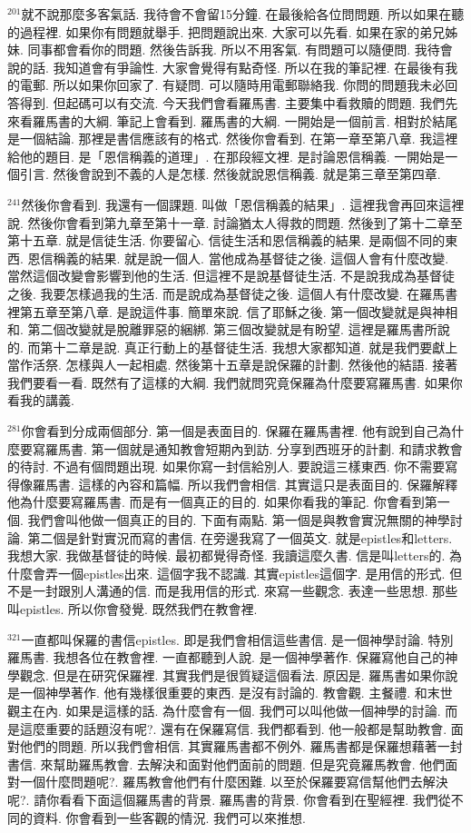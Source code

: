 \documentclass{book}
\begin{document}
$^{201}$就不說那麼多客氣話.
我待會不會留15分鐘.
在最後給各位問問題.
所以如果在聽的過程裡.
如果你有問題就舉手.
把問題說出來.
大家可以先看.
如果在家的弟兄姊妹.
同事都會看你的問題.
然後告訴我.
所以不用客氣.
有問題可以隨便問.
我待會說的話.
我知道會有爭論性.
大家會覺得有點奇怪.
所以在我的筆記裡.
在最後有我的電郵.
所以如果你回家了.
有疑問.
可以隨時用電郵聯絡我.
你問的問題我未必回答得到.
但起碼可以有交流.
今天我們會看羅馬書.
主要集中看救贖的問題.
我們先來看羅馬書的大綱.
筆記上會看到.
羅馬書的大綱.
一開始是一個前言.
相對於結尾是一個結論.
那裡是書信應該有的格式.
然後你會看到.
在第一章至第八章.
我這裡給他的題目.
是「恩信稱義的道理」.
在那段經文裡.
是討論恩信稱義.
一開始是一個引言.
然後會說到不義的人是怎樣.
然後就說恩信稱義.
就是第三章至第四章.

$^{241}$然後你會看到.
我還有一個課題.
叫做「恩信稱義的結果」.
這裡我會再回來這裡說.
然後你會看到第九章至第十一章.
討論猶太人得救的問題.
然後到了第十二章至第十五章.
就是信徒生活.
你要留心.
信徒生活和恩信稱義的結果.
是兩個不同的東西.
恩信稱義的結果.
就是說一個人.
當他成為基督徒之後.
這個人會有什麼改變.
當然這個改變會影響到他的生活.
但這裡不是說基督徒生活.
不是說我成為基督徒之後.
我要怎樣過我的生活.
而是說成為基督徒之後.
這個人有什麼改變.
在羅馬書裡第五章至第八章.
是說這件事.
簡單來說.
信了耶穌之後.
第一個改變就是與神相和.
第二個改變就是脫離罪惡的綑綁.
第三個改變就是有盼望.
這裡是羅馬書所說的.
而第十二章是說.
真正行動上的基督徒生活.
我想大家都知道.
就是我們要獻上當作活祭.
怎樣與人一起相處.
然後第十五章是說保羅的計劃.
然後他的結語.
接著我們要看一看.
既然有了這樣的大綱.
我們就問究竟保羅為什麼要寫羅馬書.
如果你看我的講義.

$^{281}$你會看到分成兩個部分.
第一個是表面目的.
保羅在羅馬書裡.
他有說到自己為什麼要寫羅馬書.
第一個就是通知教會短期內到訪.
分享到西班牙的計劃.
和請求教會的待討.
不過有個問題出現.
如果你寫一封信給別人.
要說這三樣東西.
你不需要寫得像羅馬書.
這樣的內容和篇幅.
所以我們會相信.
其實這只是表面目的.
保羅解釋他為什麼要寫羅馬書.
而是有一個真正的目的.
如果你看我的筆記.
你會看到第一個.
我們會叫他做一個真正的目的.
下面有兩點.
第一個是與教會實況無關的神學討論.
第二個是針對實況而寫的書信.
在旁邊我寫了一個英文.
就是epistles和letters.
我想大家.
我做基督徒的時候.
最初都覺得奇怪.
我讀這麼久書.
信是叫letters的.
為什麼會弄一個epistles出來.
這個字我不認識.
其實epistles這個字.
是用信的形式.
但不是一封跟別人溝通的信.
而是我用信的形式.
來寫一些觀念.
表達一些思想.
那些叫epistles.
所以你會發覺.
既然我們在教會裡.

$^{321}$一直都叫保羅的書信epistles.
即是我們會相信這些書信.
是一個神學討論.
特別羅馬書.
我想各位在教會裡.
一直都聽到人說.
是一個神學著作.
保羅寫他自己的神學觀念.
但是在研究保羅裡.
其實我們是很質疑這個看法.
原因是.
羅馬書如果你說是一個神學著作.
他有幾樣很重要的東西.
是沒有討論的.
教會觀.
主餐禮.
和末世觀主在內.
如果是這樣的話.
為什麼會有一個.
我們可以叫他做一個神學的討論.
而是這麼重要的話題沒有呢?.
還有在保羅寫信.
我們都看到.
他一般都是幫助教會.
面對他們的問題.
所以我們會相信.
其實羅馬書都不例外.
羅馬書都是保羅想藉著一封書信.
來幫助羅馬教會.
去解決和面對他們面前的問題.
但是究竟羅馬教會.
他們面對一個什麼問題呢?.
羅馬教會他們有什麼困難.
以至於保羅要寫信幫他們去解決呢?.
請你看看下面這個羅馬書的背景.
羅馬書的背景.
你會看到在聖經裡.
我們從不同的資料.
你會看到一些客觀的情況.
我們可以來推想.
\end{document}
